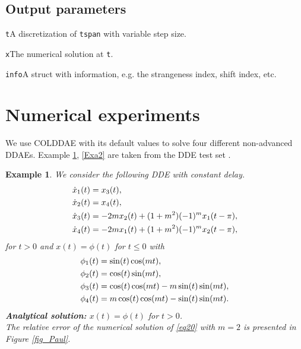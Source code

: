 \documentclass[final,reqno]{siamltex}
\renewenvironment{itemize}[1]{\begin{compactitem}#1}{\end{compactitem}}
\newtheorem{example}[theorem]{Example}
\begin{document}
\subsection{Output parameters}
\begin{itemize}
\item {\tt t}\quad A discretization of {\tt tspan} with variable step size.
\item {\tt x}\quad The numerical solution at {\tt t}.
\item {\tt info}\quad A struct with information, e.g. the strangeness index, shift index, etc.
\end{itemize}

\section{Numerical experiments}
We use COLDDAE with its default values to solve four different non-advanced DDAEs. 
Example \ref{Exa1}, \ref{Exa2} are taken from the DDE test set \cite{Pau94}.
%
\begin{example}\label{Exa1} We consider the following DDE with constant delay.
%
\bsq\label{eq20}
\begin{equation}\label{eq20a}
\bsp{
\dot{x}_1(t) & = x_3(t),\\
\dot{x}_2(t) & = x_4(t),\\
\dot{x}_3(t) & = -2mx_2(t)+(1+m^2)(-1)^mx_1(t-\pi),\\
\dot{x}_4(t) & = -2mx_1(t)+(1+m^2)(-1)^mx_2(t-\pi),
}
\end{equation}
for $t>0$ and $x(t)=\phi(t)$ for $t\leq 0$ with 
\begin{equation}\label{eq20b}
\bsp{
{\phi}_1(t) & = \sin(t)\cos(mt),\\
{\phi}_2(t) & = \cos(t)\sin(mt),\\
{\phi}_3(t) & = \cos(t)\cos(mt)-m\sin(t)\sin(mt),\\
{\phi}_4(t) & =m\cos(t)\cos(mt)-\sin(t)\sin(mt).
}
\end{equation}
\esq
%
{\bf Analytical solution:} \quad $x(t)=\phi(t)$ for $t>0$.\\
The relative error of the numerical solution of \eqref{eq20} with $m=2$ is presented in Figure \ref{fig_Paul}.
\end{example}
%
\end{document}
